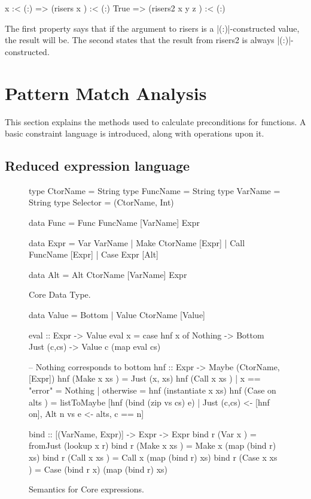 \documentclass[preprint]{sigplanconf}
\newcommand{\C}[1]{\textsf{#1}}
\begin{document}
\begin{code}
x :< (:)  => (risers x       ) :< (:)
True      => (risers2 x y z  ) :< (:)
\end{code}

The first property says that if the argument to \C{risers} is a |(:)|-constructed value, the result will be. The second states that the result from \C{risers2} is always |(:)|-constructed.

\section{Pattern Match Analysis}
\label{sec:manipulate}

This section explains the methods used to calculate preconditions for functions. A basic constraint language is introduced, along with operations upon it.

\subsection{Reduced expression language}
\label{sec:core}

\begin{figure}
\begin{code}
type CtorName  =  String
type FuncName  =  String
type VarName   =  String
type Selector  =  (CtorName, Int)

data Func  =  Func FuncName [VarName] Expr

data Expr  =  Var   VarName
           |  Make  CtorName  [Expr]
           |  Call  FuncName  [Expr]
           |  Case  Expr      [Alt]

data Alt   =  Alt CtorName [VarName] Expr
\end{code}
\caption{Core Data Type.}
\label{fig:core}
\end{figure}

\begin{figure}
\begin{code}
data Value = Bottom | Value CtorName [Value]

eval :: Expr -> Value
eval x = case  hnf x of
               Nothing      -> Bottom
               Just (c,cs)  -> Value c (map eval cs)

-- Nothing corresponds to bottom
hnf :: Expr -> Maybe (CtorName, [Expr])
hnf (Make  x   xs    )  =  Just (x, xs)
hnf (Call  x   xs    )  |  x == "error"  = Nothing
                        |  otherwise     = hnf (instantiate x xs)
hnf (Case  on  alts  )  =  listToMaybe [hnf (bind (zip vs cs) e)
       | Just (c,cs) <- [hnf on], Alt n vs e <- alts, c == n]

bind :: [(VarName, Expr)] -> Expr -> Expr
bind r (Var   x     ) = fromJust (lookup x r)
bind r (Make  x xs  ) = Make  x (map (bind r) xs)
bind r (Call  x xs  ) = Call  x (map (bind r) xs)
bind r (Case  x xs  ) = Case (bind r x) (map (bind r) xs)
\end{code}
\caption{Semantics for Core expressions.}
\label{fig:semantics}
\end{figure}
\end{document}
